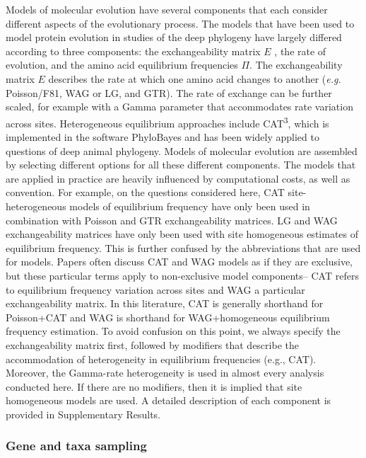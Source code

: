 \documentclass[]{article}
\begin{document}
Models of molecular evolution have several components that each consider
different aspects of the evolutionary process. The models that have been
used to model protein evolution in studies of the deep phylogeny have
largely differed according to three components: the exchangeability
matrix \(E\) , the rate of evolution, and the amino acid equilibrium
frequencies \(\Pi\). The exchangeability matrix \(E\) describes the rate
at which one amino acid changes to another (\emph{e.g.} Poisson/F81, WAG
or LG, and GTR). The rate of exchange can be further scaled, for example
with a Gamma parameter that accommodates rate variation across sites.
Heterogeneous equilibrium approaches include CAT\textsuperscript{3},
which is implemented in the software PhyloBayes and has been widely
applied to questions of deep animal phylogeny. Models of molecular
evolution are assembled by selecting different options for all these
different components. The models that are applied in practice are
heavily influenced by computational costs, as well as convention. For
example, on the questions considered here, CAT site-heterogeneous models
of equilibrium frequency have only been used in combination with Poisson
and GTR exchangeability matrices. LG and WAG exchangeability matrices
have only been used with site homogeneous estimates of equilibrium
frequency. This is further confused by the abbreviations that are used
for models. Papers often discuss CAT and WAG models as if they are
exclusive, but these particular terms apply to non-exclusive model
components-- CAT refers to equilibrium frequency variation across sites
and WAG a particular exchangeability matrix. In this literature, CAT is
generally shorthand for Poisson+CAT and WAG is shorthand for
WAG+homogeneous equilibrium frequency estimation. To avoid confusion on
this point, we always specify the exchangeability matrix first, followed
by modifiers that describe the accommodation of heterogeneity in
equilibrium frequencies (e.g., CAT). Moreover, the Gamma-rate
heterogeneity is used in almost every analysis conducted here. If there
are no modifiers, then it is implied that site homogeneous models are
used. A detailed description of each component is provided in
Supplementary Results.

\hypertarget{gene-and-taxa-sampling}{%
\subsubsection{Gene and taxa sampling}\label{gene-and-taxa-sampling}}
\end{document}

